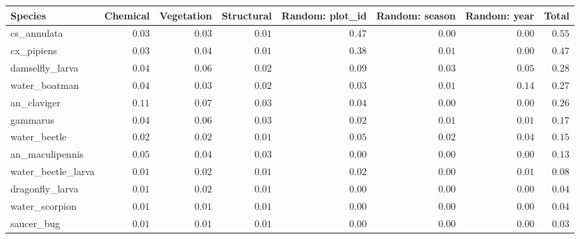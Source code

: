 \begin{longtable}{lrrrrrrr}
\toprule
Species & Chemical & Vegetation & Structural & Random: plot\_id & Random: season & Random: year & Total \\ 
\midrule
cs\_annulata & $0.03$ & $0.03$ & $0.01$ & $0.47$ & $0.00$ & $0.00$ & $0.55$ \\ 
cx\_pipiens & $0.03$ & $0.04$ & $0.01$ & $0.38$ & $0.01$ & $0.00$ & $0.47$ \\ 
damselfly\_larva & $0.04$ & $0.06$ & $0.02$ & $0.09$ & $0.03$ & $0.05$ & $0.28$ \\ 
water\_boatman & $0.04$ & $0.03$ & $0.02$ & $0.03$ & $0.01$ & $0.14$ & $0.27$ \\ 
an\_claviger & $0.11$ & $0.07$ & $0.03$ & $0.04$ & $0.00$ & $0.00$ & $0.26$ \\ 
gammarus & $0.04$ & $0.06$ & $0.03$ & $0.02$ & $0.01$ & $0.01$ & $0.17$ \\ 
water\_beetle & $0.02$ & $0.02$ & $0.01$ & $0.05$ & $0.02$ & $0.04$ & $0.15$ \\ 
an\_maculipennis & $0.05$ & $0.04$ & $0.03$ & $0.00$ & $0.00$ & $0.00$ & $0.13$ \\ 
water\_beetle\_larva & $0.01$ & $0.02$ & $0.01$ & $0.02$ & $0.00$ & $0.01$ & $0.08$ \\ 
dragonfly\_larva & $0.01$ & $0.02$ & $0.01$ & $0.00$ & $0.00$ & $0.00$ & $0.04$ \\ 
water\_scorpion & $0.01$ & $0.01$ & $0.01$ & $0.00$ & $0.00$ & $0.00$ & $0.04$ \\ 
saucer\_bug & $0.01$ & $0.01$ & $0.01$ & $0.00$ & $0.00$ & $0.00$ & $0.03$ \\ 
\bottomrule
\end{longtable}


